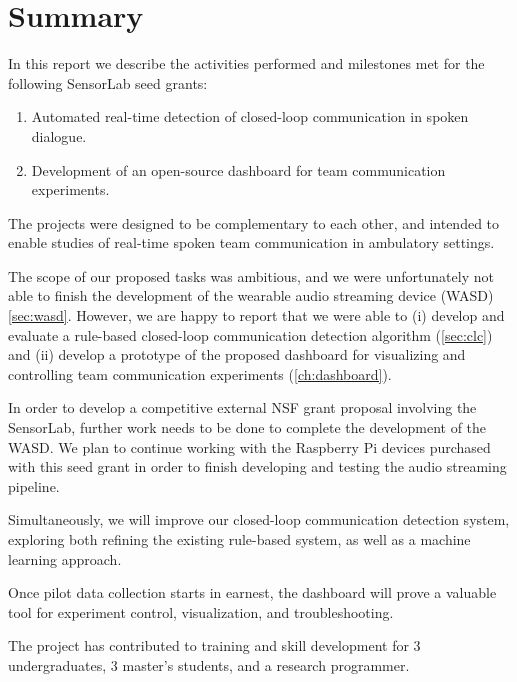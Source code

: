 \chapter{Summary}

In this report we describe the activities performed and milestones met for the
following SensorLab seed grants:

\begin{enumerate}
    \item Automated real-time detection of closed-loop communication in spoken
        dialogue.
    \item Development of an open-source dashboard for team communication
        experiments.
\end{enumerate}

The projects were designed to be complementary to each other, and intended to
enable studies of real-time spoken team communication in ambulatory settings.

The scope of our proposed tasks was ambitious, and we were unfortunately not
able to finish the development of the wearable audio streaming device (WASD)
\autoref{sec:wasd}.  However, we are happy to report that we were able to (i)
develop and evaluate a rule-based closed-loop communication detection algorithm
(\autoref{sec:clc}) and (ii) develop a prototype of the proposed dashboard for
visualizing and controlling team communication experiments
(\autoref{ch:dashboard}).

In order to develop a competitive external NSF grant proposal involving the
SensorLab, further work needs to be done to complete the development of the
WASD. We plan to continue working with the Raspberry Pi devices purchased with
this seed grant in order to finish developing and testing the audio streaming
pipeline.

Simultaneously, we will improve our closed-loop communication detection system,
exploring both refining the existing rule-based system, as well as a machine
learning approach.

Once pilot data collection starts in earnest, the dashboard will prove a
valuable tool for experiment control, visualization, and troubleshooting.

The project has contributed to training and skill development for 3
undergraduates, 3 master's students, and a research programmer.
